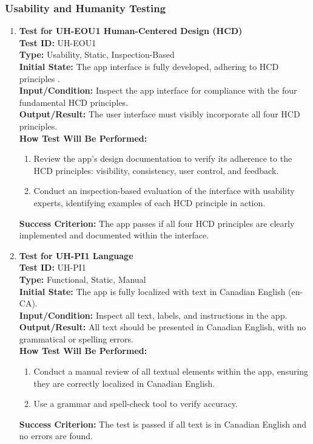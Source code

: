 \documentclass[12pt, titlepage]{article}
\begin{document}
\subsubsection{Usability and Humanity Testing}
\label{UH}
\begin{enumerate}
    \item \textbf{Test for UH-EOU1 Human-Centered Design (HCD)} \\
      \newline
      \textbf{Test ID:} UH-EOU1 \\
      \textbf{Type:} Usability, Static, Inspection-Based \\
      \textbf{Initial State:} The app interface is fully developed, adhering to HCD principles \citep*{HCD}. \\
      \textbf{Input/Condition:} Inspect the app interface for compliance with the four fundamental HCD principles. \\
      \textbf{Output/Result:} The user interface must visibly incorporate all four HCD principles. \\
      \textbf{How Test Will Be Performed:}
      \begin{enumerate}
          \item Review the app’s design documentation to verify its adherence to the HCD principles: visibility, consistency, 
          user control, and feedback.
          \item Conduct an inspection-based evaluation of the interface with usability experts, identifying examples of each HCD 
          principle in action.
      \end{enumerate}
      \textbf{Success Criterion:} The app passes if all four HCD principles are clearly implemented and documented within the interface.

    \item \textbf{Test for UH-PI1 Language} \\
      \newline
      \textbf{Test ID:} UH-PI1 \\
      \textbf{Type:} Functional, Static, Manual \\
      \textbf{Initial State:} The app is fully localized with text in Canadian English (en-CA). \\
      \textbf{Input/Condition:} Inspect all text, labels, and instructions in the app. \\
      \textbf{Output/Result:} All text should be presented in Canadian English, with no grammatical or spelling errors. \\
      \textbf{How Test Will Be Performed:}
      \begin{enumerate}
          \item Conduct a manual review of all textual elements within the app, ensuring they are correctly localized in Canadian 
          English.
          \item Use a grammar and spell-check tool to verify accuracy.
      \end{enumerate}
      \textbf{Success Criterion:} The test is passed if all text is in Canadian English and no errors are found.


\end{enumerate}
\end{document}
